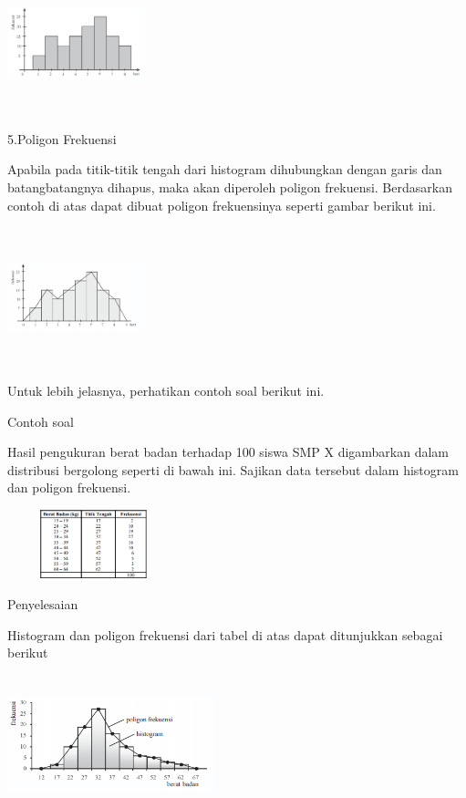 \documentclass[11pt,fleqn]{book} %
\begin{document}
{\includegraphics[width = 4cm, height= 4cm]{Pictures/8reska.png}

5.Poligon Frekuensi


Apabila pada titik-titik tengah dari histogram dihubungkan dengan garis dan batangbatangnya
dihapus, maka akan diperoleh poligon frekuensi. Berdasarkan contoh di atas
dapat dibuat poligon frekuensinya seperti gambar berikut ini.

\includegraphics[width = 4cm, height= 4cm]{Pictures/9reska.png}

Untuk lebih jelasnya, perhatikan contoh soal berikut ini.

Contoh soal

Hasil pengukuran berat badan terhadap 100 siswa SMP X digambarkan dalam distribusi
bergolong seperti di bawah ini. Sajikan data tersebut dalam histogram dan poligon frekuensi.


\includegraphics[width = 5cm, height= 2cm]{Pictures/10reska.png}

Penyelesaian

Histogram dan poligon frekuensi dari tabel di atas dapat ditunjukkan sebagai berikut

\includegraphics[width = 6cm, height= 4cm]{Pictures/11reska.png}

}
\end{document}

